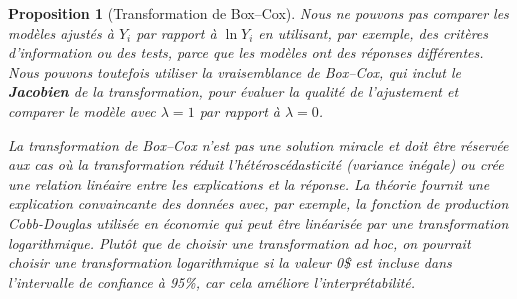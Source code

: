 \documentclass[
  11pt,
  letterpaper,
]{scrbook}
\theoremstyle{definition}
\theoremstyle{plain}
\theoremstyle{definition}
\theoremstyle{plain}
\newtheorem{proposition}{Proposition}[chapter]
\theoremstyle{remark}
\begin{document}
\begin{proposition}[Transformation de
Box--Cox]
Nous ne pouvons pas comparer les modèles ajustés à \(Y_i\) par rapport à
\(\ln Y_i\) en utilisant, par exemple, des critères d'information ou des
tests, parce que les modèles ont des réponses différentes. Nous pouvons
toutefois utiliser la vraisemblance de Box--Cox, qui inclut le
\textbf{Jacobien} de la transformation, pour évaluer la qualité de
l'ajustement et comparer le modèle avec \(\lambda=1\) par rapport à
\(\lambda=0\).

La transformation de Box--Cox n'est pas une solution miracle et doit
être réservée aux cas où la transformation réduit l'hétéroscédasticité
(variance inégale) ou crée une relation linéaire entre les explications
et la réponse. La théorie fournit une explication convaincante des
données avec, par exemple, la fonction de production Cobb-Douglas
utilisée en économie qui peut être linéarisée par une transformation
logarithmique. Plutôt que de choisir une transformation \emph{ad hoc},
on pourrait choisir une transformation logarithmique si la valeur 0\$
est incluse dans l'intervalle de confiance à 95\%, car cela améliore
l'interprétabilité.

\end{proposition}
\end{document}
